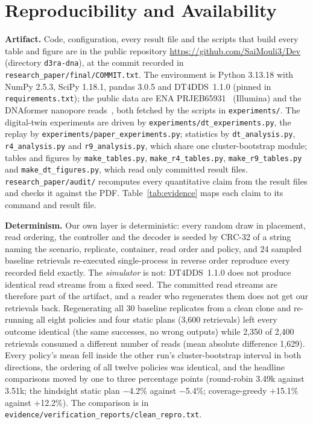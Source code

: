 \documentclass[acmsmall,screen]{acmart}
\begin{document}
\section{Reproducibility and Availability}\label{sec:repro}
\textbf{Artifact.}  Code, configuration, every result file and the scripts that build every table and
figure are in the public repository \url{https://github.com/SaiMouli3/Dev} (directory
\texttt{d3ra-dna}), at the commit recorded in \texttt{research\_paper/final/COMMIT.txt}.  The environment
is Python 3.13.18 with NumPy 2.5.3, SciPy 1.18.1, pandas 3.0.5 and DT4DDS~1.1.0 (pinned in
\texttt{requirements.txt}); the public data are ENA PRJEB65931~\cite{gimpel2023prjeb65931} (Illumina) and
the DNAformer nanopore reads~\cite{technion2025dnaformerreads,barlev2024binned}, both fetched by the scripts
in \texttt{experiments/}.  The digital-twin experiments are driven by
\texttt{experiments/dt\_experiments.py}, the replay by \texttt{experiments/paper\_experiments.py};
statistics by \texttt{dt\_analysis.py}, \texttt{r4\_analysis.py} and \texttt{r9\_analysis.py}, which share
one cluster-bootstrap module; tables and figures by \texttt{make\_tables.py}, \texttt{make\_r4\_tables.py},
\texttt{make\_r9\_tables.py} and \texttt{make\_dt\_figures.py}, which read only committed result files.
\texttt{research\_paper/audit/} recomputes every quantitative claim from the result files and checks it
against the PDF.  Table~\ref{tab:evidence} maps each claim to its command and result file.

\textbf{Determinism.}  Our own layer is deterministic: every random draw in placement, read ordering, the
controller and the decoder is seeded by CRC-32 of a string naming the scenario, replicate, container, read
order and policy, and 24 sampled baseline retrievals re-executed single-process in reverse order reproduce
every recorded field exactly.  The \emph{simulator} is not: DT4DDS~1.1.0 does not produce identical read
streams from a fixed seed.  The committed read streams are therefore part of the artifact, and a reader
who regenerates them does not get our retrievals back.  Regenerating all 30 baseline replicates from a
clean clone and re-running all eight policies and four static plans (3{,}600 retrievals) left every
outcome identical (the same successes, no wrong outputs) while 2{,}350 of 2{,}400 retrievals consumed a
different number of reads (mean absolute difference 1{,}629).  Every policy's mean fell inside the other
run's cluster-bootstrap interval in both directions, the ordering of all twelve policies was identical,
and the headline comparisons moved by one to three percentage points (round-robin 3.49k against 3.51k;
the hindsight static plan $-$4.2\% against $-$5.4\%; coverage-greedy $+$15.1\% against $+$12.2\%).  The
comparison is in \texttt{evidence/}\allowbreak\texttt{verification\_reports/}\allowbreak\texttt{clean\_repro.txt}.
\end{document}
